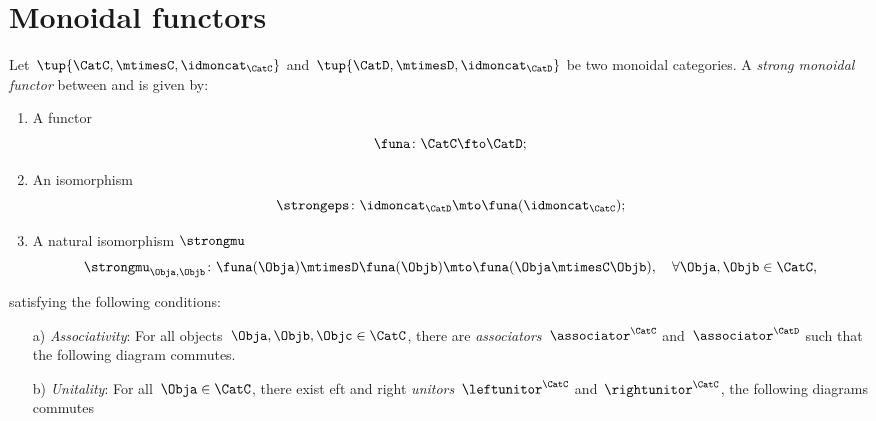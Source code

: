 

\section{Monoidal functors}
\label{sec:monoidal-functors}
\begin{ctdefinition}
    \label{def:strong-monoidal-functor}

    Let~$\tup{\CatC,\mtimesC,\idmoncat_{\CatC}}$ and~$\tup{\CatD,\mtimesD,\idmoncat_{\CatD}}$ be two monoidal categories.
    A \emph{strong monoidal functor} between \CatC and \CatD is given by:
    \begin{enumerate}
        \item A functor
        \begin{equation}
            \funa \colon \CatC \fto \CatD;
        \end{equation}
        \item An isomorphism
        \begin{equation}
            \strongeps\colon \idmoncat_{\CatD}\mto \funa(\idmoncat_{\CatC});
        \end{equation}
        \item A natural isomorphism $\strongmu$
        \begin{equation}
            \strongmu_{\Obja,\Objb}\colon \funa(\Obja)\mtimesD \funa(\Objb) \mto \funa(\Obja \mtimesC \Objb),\quad \forall \Obja,\Objb\in \CatC,
        \end{equation}
    \end{enumerate}
    satisfying the following conditions:
    \begin{enumerate}
        \item[a)] \emph{Associativity}: For all objects~$\Obja,\Objb,\Objc\in \CatC$,
        there are  \emph{associators}~$\associator^\CatC$ and~$\associator^\CatD$ such that
        the following diagram commutes.\\
        \item[b)] \emph{Unitality}: For all~$\Obja\in \CatC$, there exist eft and right \emph{unitors}~$\leftunitor^\CatC$ and~$\rightunitor^\CatC$, the following diagrams commutes\\
    \end{enumerate}
\end{ctdefinition}

